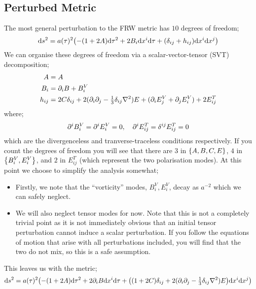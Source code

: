 \subsection{Perturbed Metric}
The most general perturbation to the FRW metric has $10$ degrees of freedom;
\begin{equation}
\ud s^2 = a(\tau)^2 \left(-(1 + 2A)\ud \tau^2 + 2B_i \ud x^i \ud \tau + (\delta_{ij} + h_{ij})\ud x^i \ud x^j\right)
\end{equation}
We can organise these degrees of freedom via a scalar-vector-tensor (SVT) decomposition;
\begin{align*}
A &= A \\
B_i &= \partial_i B + B_i^V \\
h_{ij} &= 2C\delta_{ij} + 2(\partial_i \partial_j - \tfrac{1}{3}\delta_{ij}\nabla^2)E + (\partial_i E_j^V + \partial_j E_i^V) + 2E_{ij}^T
\end{align*}
where;
\begin{equation*}
\partial^i B_i^V = \partial^i E_i^V = 0, \quad \partial^i E_{ij}^T = \delta^{ij}E_{ij}^T = 0
\end{equation*}
which are the divergenceless and tranverse-traceless conditions respectively. If you count the degrees of freedom you will see that there are $3$ in $\set{A, B, C, E}$, $4$ in $\set{B_i^V, E_i^V}$, and $2$ in $E_{ij}^T$ (which represent the two polarisation modes). At this point we choose to simplify the analysis somewhat;
\begin{itemize}
\item Firstly, we note that the ``vorticity'' modes, $B_i^V, E_i^V$, decay as $a^{-2}$ which we can safely neglect.
\item We will also neglect tensor modes for now. Note that this is not a completely trivial point as it is not immediately obvious that an initial tensor perturbation cannot induce a scalar perturbation. If you follow the equations of motion that arise with all perturbations included, you will find that the two do not mix, so this is a safe assumption.
\end{itemize}
This leaves us with the metric;
\begin{dmath}
\label{eq:metpert}
\ud s^2 = a(\tau)^2 \left(-(1 + 2A)\ud \tau^2 + 2\del_i B \ud x^i \ud \tau + \left((1 + 2C)\delta_{ij} + 2(\del_i \del_j - \tfrac{1}{3}\delta_{ij}\nabla^2)E\right)\ud x^i \ud x^j\right)
\end{dmath}
